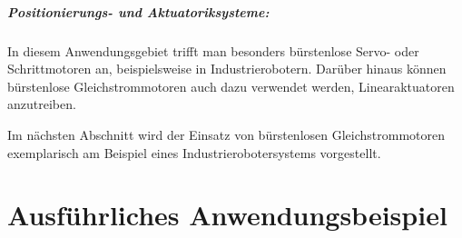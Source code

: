\subparagraph{Positionierungs- und Aktuatoriksysteme:} In diesem Anwendungsgebiet trifft man besonders bürstenlose Servo- oder Schrittmotoren an, beispielsweise in Industrierobotern. Darüber hinaus können bürstenlose Gleichstrommotoren auch dazu verwendet werden, Linearaktuatoren anzutreiben.

Im nächsten Abschnitt wird der Einsatz von bürstenlosen Gleichstrommotoren exemplarisch am Beispiel eines Industrierobotersystems vorgestellt.

\section{Ausführliches Anwendungsbeispiel}



